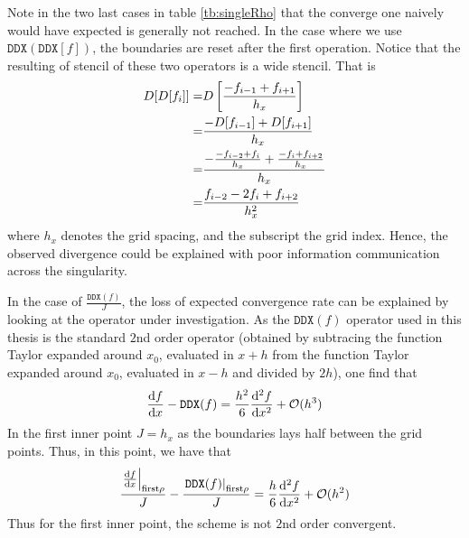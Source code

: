 Note in the two last cases in table \ref{tb:singleRho} that the converge one
naively would have expected is generally not reached. In the case where we use
$\texttt{DDX}(\texttt{DDX}[f])$, the boundaries are reset after the first
operation. Notice that the resulting of stencil of these two operators is a
wide stencil. That is
%
\begin{align*}
D[D[f_i]] =& D\left[\frac{-f_{i-1} + f_{i+1}}{h_x}\right]
\\
=& \frac{-D[f_{i-1}] + D[f_{i+1}]}{h_x}
\\
=& \frac{-\frac{-f_{i-2} + f_{i}}{h_x} + \frac{-f_{i} + f_{i+2}}{h_x}}{h_x}
\\
=& \frac{f_{i-2} - 2f_{i} + f_{i+2}}{h_x^2}
\end{align*}
%
where $h_x$ denotes the grid spacing, and the subscript the grid index. Hence,
the observed divergence could be explained with poor information communication
across the singularity.

In the case of $\frac{\texttt{DDX}(f)}{J}$, the loss of expected convergence
rate can be explained by looking at the operator under investigation. As the
$\texttt{DDX}(f)$ operator used in this thesis is the standard $2$nd order
operator (obtained by subtracing the function Taylor expanded around $x_0$,
evaluated in $x+h$ from the function Taylor expanded around $x_0$,
evaluated in $x-h$ and divided by $2h$), one find that
%
\begin{align*}
    \frac{\text{d}{f}}{\text{d}{x}} - \texttt{DDX}(f) =
    \frac{h^2}{6}\frac{\text{d}{^2f}}{\text{d}{x^2}} + \mathcal{O}(h^3)
\end{align*}
%
In the first inner point $J=h_x$ as the boundaries lays half between the grid
points. Thus, in this point, we have that
%
\begin{align*}
    \frac{ \left.\frac{\text{d}{f}}{\text{d}{x}} \right|_{\text{first} \rho}}{J}
    - \frac{\left. \texttt{DDX}(f)\right|_{\text{first} \rho}}{J}=
    \frac{h}{6}\frac{\text{d}{^2f}}{\text{d}{x^2}} + \mathcal{O}(h^2)
\end{align*}
%
Thus for the first inner point, the scheme is not $2$nd order convergent.

